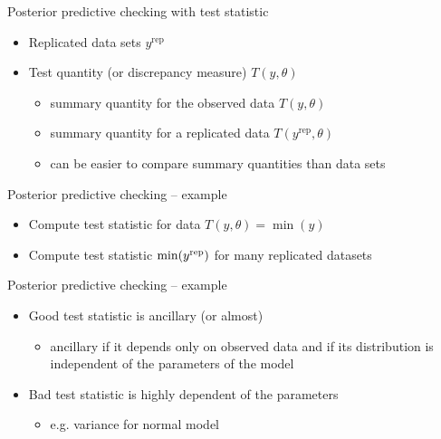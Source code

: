\documentclass[t]{beamer}
\DeclareMathOperator{\rep}{\mathrm{rep}}
\begin{document}
\begin{frame}{Posterior predictive checking with test statistic}

  \begin{itemize}
  \item Replicated data sets $y^{\rep}$
  \item Test quantity (or discrepancy measure) $T(y,\theta)$
    \begin{itemize}
    \item summary quantity for the observed data $T(y,\theta)$
    \item summary quantity for a replicated data $T(y^{\rep},\theta)$
    \item can be easier to compare summary quantities than data sets
    \end{itemize}
  \end{itemize}

\end{frame}

\begin{frame}{Posterior predictive checking -- example}

  \begin{itemize}
  \item<1-> Compute test statistic for data $T(y,\theta)=\min(y)$
  \item<2-> Compute test statistic $\min(y^{\rm rep})$ for many replicated datasets 
  \end{itemize}
  \vspace{-1.5\baselineskip}

\end{frame}

\begin{frame}{Posterior predictive checking -- example}

  \begin{itemize}
  \item<1-> Good test statistic is ancillary (or almost)
    \begin{itemize}
    \item ancillary if it depends only on observed data and if its
      distribution is independent of the parameters of the model
    \end{itemize}
  \item<2-> Bad test statistic is highly dependent of the parameters
    \begin{itemize}
    \item e.g. variance for normal model
    \end{itemize}
  \end{itemize}
  \vspace{-1.5\baselineskip}

\end{frame}
\end{document}
